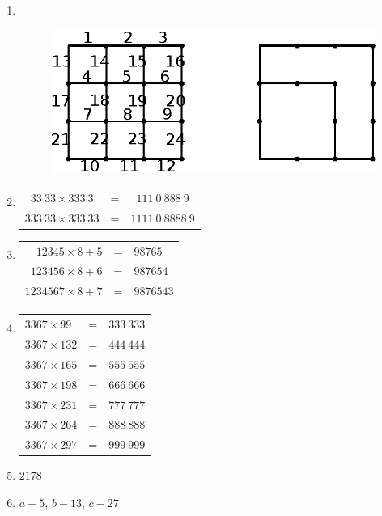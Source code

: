 \begin{enumerate}
\item
~

\begin{figure}[H]
\centering
{}
\includegraphics{images/chap3/ans16.eps}
\end{figure}


\item 
\begin{tabular}[t]{ccc}
$33~33 \times 333~3$ & = & $111~0~888~9$\\
$333~33 \times 333~33$ & = & $1111~0~8888~9$
\end{tabular}

\smallskip
\item 
\begin{tabular}[t]{rrl}
$12345 \times 8 + 5$ & = & $98765$\\
$123456 \times 8 + 6$ & = & $987654$\\
$1234567 \times 8 + 7$ & = & $9876543$
\end{tabular}

\smallskip
\item
\begin{tabular}[t]{lll}
$3367 \times 99$ & = & $333~333$\\
$3367 \times 132$ & = & $444~444$\\
$3367 \times 165$ & = & $555~555$\\
$3367 \times 198$ & = & $666~666$\\
$3367 \times 231$ & = & $777~777$\\
$3367 \times 264$ & = & $888~888$\\
$3367 \times 297$ & = & $999~999$
\end{tabular}

\item $2178$

\item $a - 5$, $b - 13$, $c - 27$


\end{enumerate}
